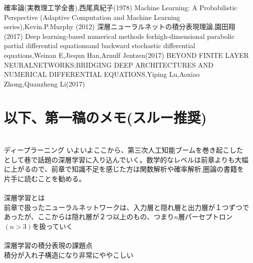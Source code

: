 \documentclass{jsarticle}
\begin{document}
\newpage
\begin{thebibliography}{99}
   確率論(実教理工学全書),西尾真紀子(1978)
   Machine Learning: A Probabilistic Perspective (Adaptive Computation and Machine Learning series),Kevin.P.Murphy (2012)
   深層ニューラルネットの積分表現理論,園田翔(2017)
   Deep learning-based numerical methods forhigh-dimensional parabolic partial differential equationsand backward stochastic differential equations,Weinan E,Jiequn Han,Arnulf Jentzen(2017)
   BEYOND FINITE LAYER NEURALNETWORKS:BRIDGING DEEP ARCHITECTURES AND NUMERICAL DIFFERENTIAL EQUATIONS,Yiping Lu,Aoxiao Zhong,Quanzheng Li(2017)
\end{thebibliography}



\newpage
\section{以下、第一稿のメモ(スルー推奨)}
　\\

ディープラーニング
いよいよここから、第三次人工知能ブームを巻き起こしたとして巷で話題の深層学習に入り込んでいく。数学的なレベルは前章よりも大幅に上がるので、前章で知識不足を感じた方は関数解析や確率解析,圏論の書籍を片手に読むことを勧める。\\
　\\
深層学習とは\\
前章で扱ったニューラルネットワークは、入力層と隠れ層と出力層が１つずつであったが、ここからは隠れ層が２つ以上のもの、つまり$n$層パーセプトロン$(n>3)$を扱っていく\\
　\\
深層学習の積分表現の課題点\\
積分が入れ子構造になり非常にややこしい\\
 
\end{document}
